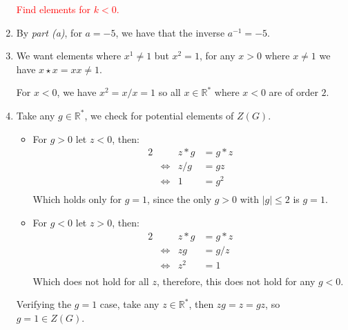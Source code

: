 \documentclass[a4paper, 11pt]{article}
\newcommand{\RR}{\mathbb{R}}
\begin{document}
\begin{enumerate}[label=(\alph*)]
	\textcolor{red}{Find elements for $k<0$.}
	
	\item 
	By \textit{part (a)}, for $a=-5$, we have that the inverse $a^{-1}=-5$. 
	
	\item 
	We want elements where $x^1\neq 1$ but $x^2=1$, for any $x>0$ where $x\neq 1$ we have $x\star x = xx \neq 1$.

	For $x<0$, we have $x^2=x/x=1$ so all $x\in\RR^*$ where $x<0$ are of order $2$. 
	
	\item 
	Take any $g\in\RR^*$, we check for potential elements of $Z(G)$. 

	\begin{itemize}
		\item For $g>0$ let $z<0$, then:
		\begin{alignat*}{2}
			&          & z*g &= g*z   \\
			& \iff     & z/g &= gz    \\ 
			& \iff     & 1   &= g^2  \\ 
		\end{alignat*}
		Which holds only for $g=1$, since the only $g>0$ with $|g|\leq 2$ is $g=1$. 

		\item For $g<0$ let $z>0$, then:
		\begin{alignat*}{2}
			&          & z*g &= g*z \\
			& \iff     & zg  &= g/z \\ 
			& \iff     & z^2 &= 1   \\ 
		\end{alignat*}
		Which does not hold for all $z$, therefore, this does not hold for any $g<0$. 
	\end{itemize}
	Verifying the $g=1$ case, take any $z\in\RR^*$, then $zg = z = gz$, so $g=1\in Z(G)$. 

\end{enumerate}

\pagebreak
\end{document}
